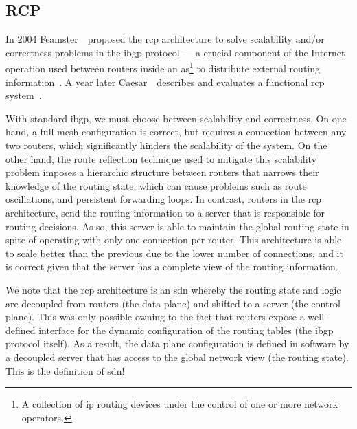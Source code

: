 \subsection{RCP}

In 2004 Feamster~\etal\ proposed the \gls{rcp} architecture to solve scalability and/or correctness problems in the \gls{ibgp} protocol --- 
a crucial component of the Internet operation used between routers inside an \gls{as}\footnote{A collection of \gls{ip} routing devices under the control of one or more network operators.} to distribute external routing information~\cite{Feamster:2004tg}. 
A year later Caesar~\etal\ describes and evaluates a functional \gls{rcp} system~\cite{Caesar:2005ws}. 

With standard \gls{ibgp}, we must choose between scalability and correctness. 
On one hand, a full mesh configuration is correct, but requires a connection between any two routers, which significantly hinders the scalability of the system. 
On the other hand, the route reflection technique used to mitigate this scalability problem imposes a hierarchic structure between routers that narrows their knowledge of the routing state, which can cause problems such as route oscillations, and persistent forwarding loops. 
In contrast, routers in the \gls{rcp} architecture, send the routing information to a server that is responsible for routing decisions. 
As so, this server is able to maintain the global routing state in spite of operating with only one connection per router.
This architecture is able to scale better than the previous due to the lower number of connections, and it is correct given that the server has a complete view of the routing information.  

We note that the \gls{rcp} architecture is an \gls{sdn} whereby the routing state and logic are decoupled from routers (the data plane) and shifted to a server (the control plane). 
This was only possible owning to the fact that routers expose a well-defined interface for the dynamic configuration of the routing tables (the \gls{ibgp} protocol itself). 
As a result, the data plane configuration is defined in software by a decoupled server that has access to the global network view (the routing state). 
This is the definition of \gls{sdn}!

